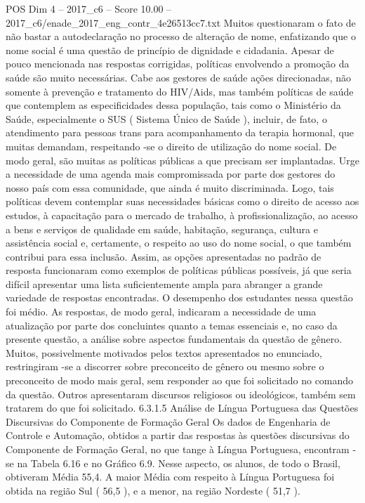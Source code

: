 \begin{textsample}{POS Dim 4 – 2017\_c6 – Score 10.00 – 2017\_c6/enade\_2017\_eng\_contr\_4e26513cc7.txt}
Muitos questionaram o fato de não bastar a autodeclaração no processo de alteração de nome, enfatizando que o nome social é uma questão de princípio de dignidade e cidadania.
Apesar de pouco mencionada nas respostas corrigidas, políticas envolvendo a promoção da saúde são muito necessárias.
Cabe aos gestores de saúde ações direcionadas, não somente à prevenção e tratamento do HIV/Aids, mas também políticas de saúde que contemplem as especificidades dessa população, tais como o Ministério da Saúde, especialmente o SUS ( Sistema Único de Saúde ), incluir, de fato, o atendimento para pessoas trans para acompanhamento da terapia hormonal, que muitas demandam, respeitando -se o direito de utilização do nome social.
De modo geral, são muitas as políticas públicas a que precisam ser implantadas.
Urge a necessidade de uma agenda mais compromissada por parte dos gestores do nosso país com essa comunidade, que ainda é muito discriminada.
Logo, tais políticas devem contemplar suas necessidades básicas como o direito de acesso aos estudos, à capacitação para o mercado de trabalho, à profissionalização, ao acesso a bens e serviços de qualidade em saúde, habitação, segurança, cultura e assistência social e, certamente, o respeito ao uso do nome social, o que também contribui para essa inclusão.
Assim, as opções apresentadas no padrão de resposta funcionaram como exemplos de políticas públicas possíveis, já que seria difícil apresentar uma lista suficientemente ampla para abranger a grande variedade de respostas encontradas.
O desempenho dos estudantes nessa questão foi médio.
As respostas, de modo geral, indicaram a necessidade de uma atualização por parte dos concluintes quanto a temas essenciais e, no caso da presente questão, a análise sobre aspectos fundamentais da questão de gênero.
Muitos, possivelmente motivados pelos textos apresentados no enunciado, restringiram -se a discorrer sobre preconceito de gênero ou mesmo sobre o preconceito de modo mais geral, sem responder ao que foi solicitado no comando da questão.
Outros apresentaram discursos religiosos ou ideológicos, também sem tratarem do que foi solicitado. 6.3.1.5 Análise de Língua Portuguesa das Questões Discursivas do Componente de Formação Geral Os dados de Engenharia de Controle e Automação, obtidos a partir das respostas às questões discursivas do Componente de Formação Geral, no que tange à Língua Portuguesa, encontram -se na Tabela 6.16 e no Gráfico 6.9.
Nesse aspecto, os alunos, de todo o Brasil, obtiveram Média 55,4.
A maior Média com respeito à Língua Portuguesa foi obtida na região Sul ( 56,5 ), e a menor, na região Nordeste ( 51,7 ).

\end{textsample}
